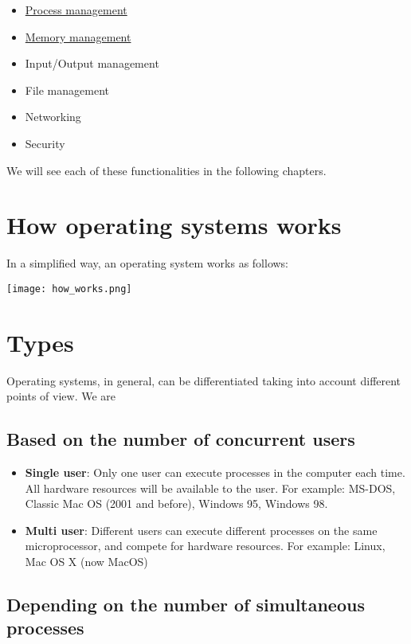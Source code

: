 \begin{itemize}
    \item \hyperlink{process_management}{Process management}
    \item \hyperlink{memory_management}{Memory management}
    \item Input/Output management
    \item File management
    \item Networking
    \item Security
\end{itemize}

We will see each of these functionalities in the following chapters.


\section{How operating systems works}

In a simplified way, an operating system works as follows:

\begin{center}
    \texttt{[image: how\_works.png]}
\end{center}



\section{Types}
Operating systems, in general, can be differentiated taking into account different points of view. We are

\subsection{Based on the number of concurrent users}
\begin{itemize}
    \item \textbf{Single user}: Only one user can execute processes in the computer each time. All hardware resources will be available to the user. For example: MS-DOS, Classic Mac OS (2001 and before), Windows 95, Windows 98.

    \item \textbf{Multi user}: Different users can execute different processes on the same microprocessor, and compete for hardware resources. For example: Linux, Mac OS X (now MacOS)
\end{itemize}

\subsection{Depending on the number of simultaneous processes}

